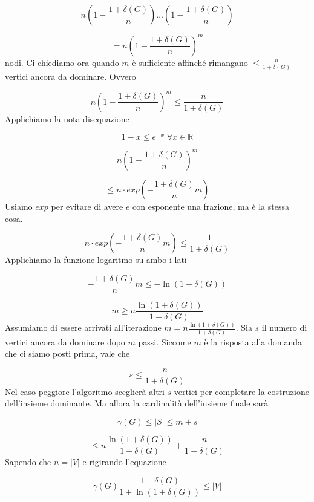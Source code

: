 \documentclass[12pt]{report}
\begin{document}
\begin{dimo}
$$n(1-\frac{1 +\delta(G)}{n}) \dots (1-\frac{1 +\delta(G)}{n})$$

$$= n(1-\frac{1 +\delta(G)}{n})^m$$
nodi. Ci chiediamo ora quando $m$ è sufficiente affinché rimangano $\leq \frac{n}{1 + \delta(G)}$ vertici ancora da dominare. Ovvero

$$n(1-\frac{1 +\delta(G)}{n})^m \leq \frac{n}{1 + \delta(G)}$$
Applichiamo la nota disequazione 

$$1-x \leq e^{-x} \; \forall x \in \mathbb{R}$$


\begin{center}
\end{center}


$$n(1-\frac{1 +\delta(G)}{n})^m $$

$$\leq n \cdot exp(-\frac{1 + \delta(G)}{n}m)$$ Usiamo $exp$ per evitare di avere $e$ con esponente una frazione, ma è la stessa cosa.

$$n \cdot exp(-\frac{1 + \delta(G)}{n}m)\leq \frac{1}{1 + \delta(G)}$$ Applichiamo la funzione logaritmo su ambo i lati

$$- \frac{1 + \delta(G)}{n} m \leq -\ln(1+ \delta(G)) $$

$$m \geq  n \frac{\ln(1 + \delta(G))}{1 + \delta(G)}$$
Assumiamo di essere arrivati all'iterazione $m = n \frac{\ln(1 + \delta(G))}{1 + \delta(G)}$. Sia $s$ il numero di vertici ancora da dominare dopo $m$ passi.  Siccome $m$ è la risposta alla domanda che ci siamo posti prima, vale che

$$s \leq \frac{n}{1 + \delta(G)}$$ 
Nel caso peggiore l'algoritmo sceglierà altri $s$ vertici per completare la costruzione dell'insieme dominante. Ma allora la cardinalità dell'insieme finale sarà 

$$\gamma(G) \leq |S| \leq m + s$$

$$\leq n \frac{\ln(1 + \delta(G))}{1 + \delta(G)} +  \frac{n}{1 + \delta(G)}$$ Sapendo che $n = |V|$ e rigirando l'equazione

$$\gamma(G) \frac{1 + \delta(G)}{1 + \ln{(1 + \delta(G))}} \leq |V|$$

\end{dimo}
\end{document}
